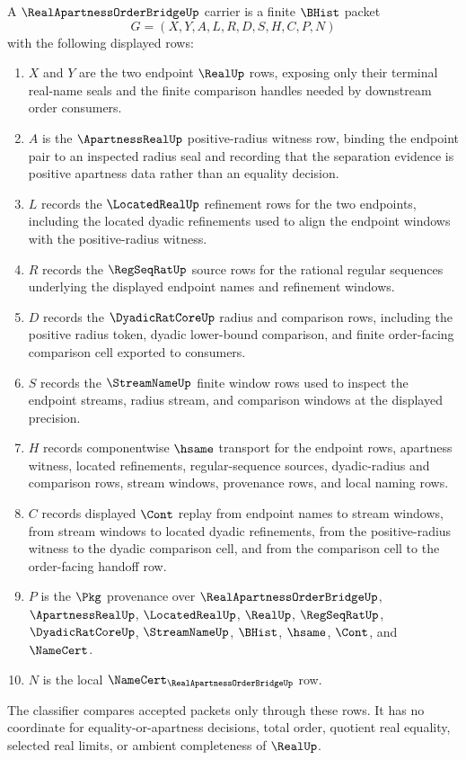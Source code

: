 \begin{definition}
\label{def:real-apartness-order-bridge-carrier}
A $\RealApartnessOrderBridgeUp$ carrier is a finite $\BHist$ packet
$$
G=(X,Y,A,L,R,D,S,H,C,P,N)
$$
with the following displayed rows:
\begin{enumerate}
\item $X$ and $Y$ are the two endpoint $\RealUp$ rows, exposing only their terminal real-name seals and the finite comparison handles needed by downstream order consumers.
\item $A$ is the $\ApartnessRealUp$ positive-radius witness row, binding the endpoint pair to an inspected radius seal and recording that the separation evidence is positive apartness data rather than an equality decision.
\item $L$ records the $\LocatedRealUp$ refinement rows for the two endpoints, including the located dyadic refinements used to align the endpoint windows with the positive-radius witness.
\item $R$ records the $\RegSeqRatUp$ source rows for the rational regular sequences underlying the displayed endpoint names and refinement windows.
\item $D$ records the $\DyadicRatCoreUp$ radius and comparison rows, including the positive radius token, dyadic lower-bound comparison, and finite order-facing comparison cell exported to consumers.
\item $S$ records the $\StreamNameUp$ finite window rows used to inspect the endpoint streams, radius stream, and comparison windows at the displayed precision.
\item $H$ records componentwise $\hsame$ transport for the endpoint rows, apartness witness, located refinements, regular-sequence sources, dyadic-radius and comparison rows, stream windows, provenance rows, and local naming rows.
\item $C$ records displayed $\Cont$ replay from endpoint names to stream windows, from stream windows to located dyadic refinements, from the positive-radius witness to the dyadic comparison cell, and from the comparison cell to the order-facing handoff row.
\item $P$ is the $\Pkg$ provenance over $\RealApartnessOrderBridgeUp$, $\ApartnessRealUp$, $\LocatedRealUp$, $\RealUp$, $\RegSeqRatUp$, $\DyadicRatCoreUp$, $\StreamNameUp$, $\BHist$, $\hsame$, $\Cont$, and $\NameCert$.
\item $N$ is the local $\NameCert_{\RealApartnessOrderBridgeUp}$ row.
\end{enumerate}
The classifier compares accepted packets only through these rows. It has no coordinate for equality-or-apartness decisions, total order, quotient real equality, selected real limits, or ambient completeness of $\RealUp$.
\end{definition}

